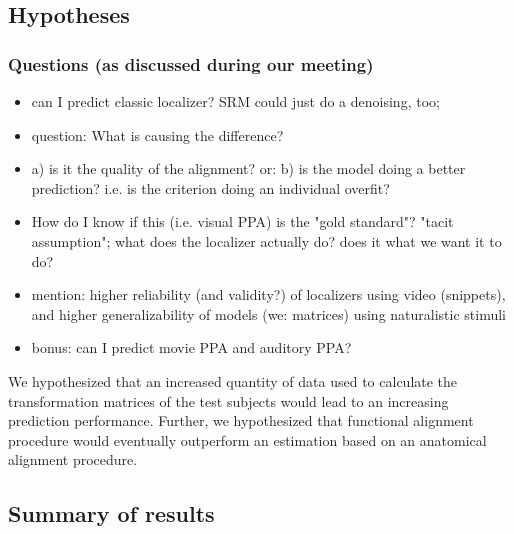 \subsection{Hypotheses}

\subsubsection{Questions (as discussed during our meeting)}


\begin{itemize}
    \item can I predict classic localizer?  SRM could just do a denoising, too;
    \item question: What is causing the difference?
    \item a) is it the quality of the alignment? or:
        b) is the model doing a better prediction?
        i.e. is the criterion doing an individual overfit?
    \item How do I know if this (i.e. visual PPA) is the "gold standard"?
        "tacit assumption";
        what does the localizer actually do?
        does it what we want it to do?
    \item mention: higher reliability (and validity?) of localizers using video
        (snippets), and higher generalizability of models (we: matrices) using
        naturalistic stimuli
    \item bonus: can I predict movie PPA and auditory PPA?
\end{itemize}

%
We hypothesized that an increased quantity of data used to calculate the
transformation matrices of the test subjects would lead to an increasing
prediction performance.
%
Further, we hypothesized that functional alignment procedure would eventually
outperform an estimation based on an anatomical alignment procedure.


\subsection{Summary of results}



